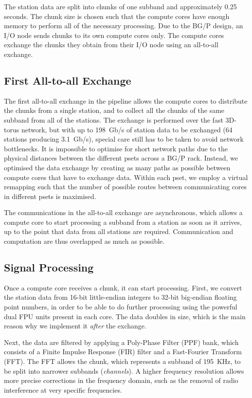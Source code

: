 \documentclass{llncs}
\begin{document}
The station data are split into chunks of one subband and approximately 0.25 seconds. The chunk size is chosen such that the compute cores have enough memory to perform all of the necessary processing. Due to the BG/P design, an I/O node sends chunks to its own compute cores only. The compute cores exchange the chunks they obtain from their I/O node using an all-to-all exchange. 

\subsection{First All-to-all Exchange}

The first all-to-all exchange in the pipeline allows the compute cores to distribute the chunks from a single station, and to collect all the chunks of the same subband from all of the stations. The exchange is performed over the fast 3D-torus network, but with up to 198~Gb/s of station data to be exchanged (64 stations producing 3.1~Gb/s), special care still has to be taken to avoid network bottlenecks. It is impossible to optimise for short network paths due to the physical distances between the different psets across a BG/P rack. Instead, we optimised the data exchange by creating as many paths as possible between compute cores that have to exchange data. Within each pset, we employ a virtual remapping such that the number of possible routes between communicating cores in different psets is maximised.

The communications in the all-to-all exchange are asynchronous, which allows a compute core to start processing a subband from a station as soon as it arrives, up to the point that data from all stations are required. Communication and computation are thus overlapped as much as possible.

\subsection{Signal Processing}

Once a compute core receives a chunk, it can start processing. First, we convert the station data from 16-bit little-endian integers to 32-bit big-endian floating point numbers, in order to be able to do further processing using the powerful dual FPU units present in each core. The data doubles in size, which is the main reason why we implement it \emph{after} the exchange.

Next, the data are filtered by applying a Poly-Phase Filter (PPF) bank, which consists of a Finite Impulse Response (FIR) filter and a Fast-Fourier Transform (FFT). The FFT allows the chunk, which represents a subband of 195~KHz, to be split into narrower subbands (\emph{channels}). A higher frequency resolution allows more precise corrections in the frequency domain, such as the removal of radio interference at very specific frequencies.
\end{document}
